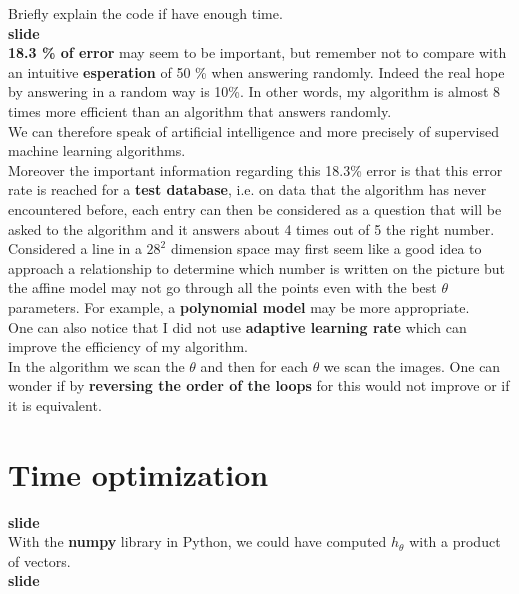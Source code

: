 \documentclass{article}
\begin{document}
		Briefly explain the code if have enough time.\\
	
		\textbf{slide}\\
		
		\textbf{18.3 \% of error} may seem to be important, but remember not to compare with an intuitive \textbf{esperation} of 50 \% when answering randomly. Indeed the real hope by answering in a random way is 10\%. In other words, my algorithm is almost 8 times more efficient than an algorithm that answers randomly.\\
		We can therefore speak of artificial intelligence and more precisely of supervised machine learning algorithms.\\
		Moreover the important information regarding this 18.3\% error is that this error rate is reached for a \textbf{test database}, i.e. on data that the algorithm has never encountered before, each entry can then be considered as a question that will be asked to the algorithm and it answers about 4 times out of 5 the right number.\\
	
		Considered a line in a $28^2$ dimension space may first seem like a good idea to approach a relationship to determine which number is written on the picture but the affine model may not go through all the points even with the best $\theta$ parameters. For example, a \textbf{polynomial model} may be more appropriate.\\
		One can also notice that I did not use \textbf{adaptive learning rate} which can improve the efficiency of my algorithm.\\
	
	In the algorithm we scan the $\theta$ and then for each $\theta$ we scan the images. One can wonder if by \textbf{reversing the order of the loops} for this would not improve or if it is equivalent.\\
	
  \section{Time optimization}
	
	\textbf{slide}\\
	
	With the \textbf{numpy} library in Python, we could have computed $h_\theta$ with a product of vectors.\\
	
	\textbf{slide}\\
	
\end{document}
